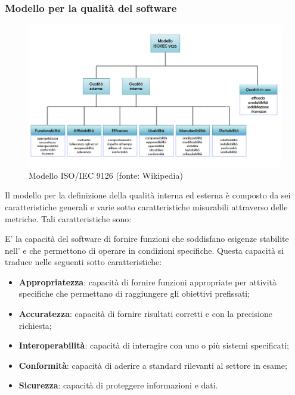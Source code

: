 	\subsubsection{Modello per la qualità del software}
	\begin{figure}[H]
		\centering
		\includegraphics[scale=0.5]{./res/img/ISO_IEC_9126.png}
		\caption[Modello ISO/IEC 9126]{Modello ISO/IEC 9126 (fonte: Wikipedia)}
	\end{figure}
	
	Il modello per la definizione della qualità interna ed esterna è composto da sei caratteristiche generali e varie sotto caratteristiche misurabili attraverso delle metriche. Tali caratteristiche sono:
	
	E' la capacità del software di fornire funzioni che soddisfano esigenze stabilite nell'\AdR{} e che permettono di operare in condizioni specifiche. Questa capacità si traduce nelle seguenti sotto caratteristiche:
	\begin{itemize}
		\item{\textbf{Appropriatezza}: capacità di fornire funzioni appropriate per attività specifiche che permettano di raggiungere gli obiettivi prefissati;}
		\item{\textbf{Accuratezza}: capacità di fornire risultati corretti e con la precisione richiesta;}
		\item{\textbf{Interoperabilità}: capacità di interagire con uno o più sistemi specificati;}
		\item{\textbf{Conformità}: capacità di aderire a standard rilevanti al settore in esame;}
		\item{\textbf{Sicurezza}: capacità di proteggere informazioni e dati.}
	\end{itemize}
	
